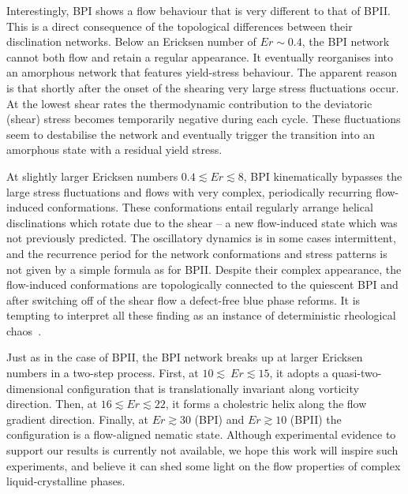 \documentclass[aps,pre,reprint,superscriptaddress, twocolumn]{revtex4}
\begin{document}
Interestingly, BPI shows a flow behaviour that is very different to that of BPII.
This is a direct consequence of the topological differences between their disclination 
networks. Below an Ericksen number of $Er\sim 0.4$, the BPI network cannot both flow and 
retain a regular appearance. It eventually reorganises into an amorphous network that
features yield-stress behaviour. The apparent reason is that shortly after the onset of the shearing 
very large stress fluctuations occur. At the lowest shear rates
the thermodynamic contribution to the deviatoric (shear) stress becomes temporarily 
negative during each cycle. These fluctuations seem to destabilise the network and 
eventually trigger the transition into an amorphous state with a residual yield
stress. 

At slightly larger Ericksen numbers $0.4\lesssim Er \lesssim8$,
BPI kinematically bypasses the large stress fluctuations and 
flows with very complex, periodically recurring flow-induced conformations.
These conformations entail regularly arrange helical disclinations which 
rotate due to the shear -- a new flow-induced state which was not previously
predicted. 
The oscillatory dynamics is in some cases intermittent, and the
recurrence period for the network conformations and stress patterns
is not given by a simple formula as for BPII.
Despite their complex appearance, the flow-induced conformations are 
topologically connected to the quiescent BPI and after switching off of the 
shear flow a defect-free blue phase reforms. It is tempting to
interpret all these finding as an instance of 
deterministic rheological chaos~\cite{fielding}.

Just as in the case of BPII, the BPI network breaks up at larger Ericksen numbers in
a two-step process. First, at $10\lesssim\ Er\lesssim 15$, it adopts a 
quasi-two-dimensional configuration that is translationally invariant along vorticity direction. 
Then, at $16\lesssim Er \lesssim 22$, it forms a cholestric helix along the flow gradient 
direction.  Finally, at $Er\gtrsim30$ (BPI) and $Er\gtrsim10$ (BPII) the configuration
is a flow-aligned nematic state.
Although experimental evidence to support
our results is currently not available, we hope this work will inspire such experiments, and believe it can shed some light 
on the flow properties of complex liquid-crystalline phases.

\end{document}
